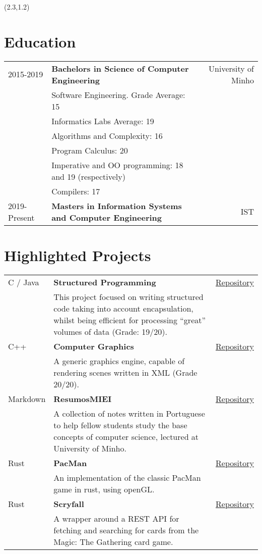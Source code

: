 \documentclass{article}
\begin{document}
\begin{textblock}{7.3} (2.3,1.2)

    \section{Education}
    \begin{tabular}{lp{8.4cm}r}
        2015-2019 & \textbf{Bachelors in Science of Computer Engineering} & University of Minho\\
        & Software Engineering. Grade Average: 15 &\\
        & Informatics Labs Average: 19 & \\
        & Algorithms and Complexity: 16 & \\
        & Program Calculus: 20 & \\
        & Imperative and OO programming: 18 and 19 (respectively) &\\
        & Compilers: 17 &\\
        2019-Present & \textbf{Masters in Information Systems and Computer Engineering} & IST\\
    \end{tabular}

    \section{Highlighted Projects}
    \begin{tabular}{lp{10.4cm}r}
        C / Java & \textbf{Structured Programming} & \href{https://github.com/mendess/LI3_StructuredPrograming}{Repository}\\
        & This project focused on writing structured code taking into account
        encapsulation, whilst being efficient for processing ``great'' volumes of
        data (Grade: 19/20). &\\
        C++ & \textbf{Computer Graphics} & \href{https://github.com/mendess/CG}{Repository}\\
        & A generic graphics engine, capable of rendering scenes written in XML (Grade 20/20). &\\
        Markdown & \textbf{ResumosMIEI} & \href{https://github.com/mendess/ResumosMIEI}{Repository}\\
        & A collection of notes written in Portuguese to help fellow students
        study the base concepts of computer science, lectured at University of
        Minho. &\\
        Rust & \textbf{PacMan} & \href{https://github.com/mendess/rust-pacman}{Repository}\\
        & An implementation of the classic PacMan game in rust, using openGL.\@ &\\
        Rust & \textbf{Scryfall} & \href{https://github.com/mendess/scryfall-rs}{Repository}\\
        & A wrapper around a REST API for fetching and searching for cards from
        the Magic: The Gathering\texttrademark{} card game. &\\
    \end{tabular}


\end{textblock}
\end{document}
